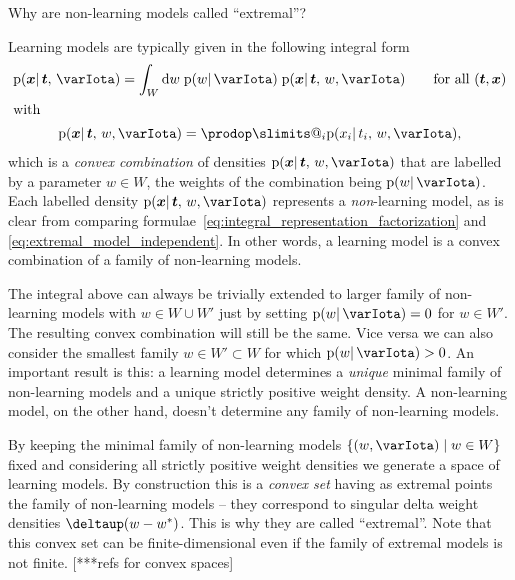 \documentclass[\ifafour a4paper,12pt,\else a5paper,10pt,\fi%
onecolumn,oneside,article,%
british%
]{memoir}
\makeatletter
\theoremstyle{remark}
\theoremstyle{innote}
\def\prod{\DOTSI\prodop\slimits@}
\newcommand*{\delt}{\deltaup}%
\newcommand*{\di}{\mathrm{d}}%
\newcommand*{\suchthat}{\mid}%
\DeclarePairedDelimiter\set{\{}{\}}
\newcommand*{\pf}{\mathrm{p}}%
\renewcommand*{\|}{\mathpunct{|}}
\newcommand*{\yI}{\varIota}
\newcommand*{\yt}{\bm{t}}
\newcommand*{\yx}{\bm{x}}
\newcommand*{\yw}{w}
\newcommand*{\yws}{W}
\newcommand*{\ywp}{\yw^{*}}
\makeatother
\begin{document}
\bigskip

Why are non-learning models called \enquote{extremal}?

Learning models are typically given in the following integral form
\begin{subequations}
    \label{eq:integral_representation_learning_model}
  \begin{gather}
    \pf(\yx \| \yt,\, \yI) =
    \int_{\yws} \di\yw\; \pf(\yw \| \yI)\;
    \pf(\yx \| \yt,\, \yw, \yI)
    \qquad\text{for all $(\yt,\yx)$}
    \\
    \shortintertext{with}
    \label{eq:integral_representation_factorization}
    \pf(\yx \| \yt,\, \yw, \yI) =
    \prod_i  \pf(x_i \| t_i,\, \yw, \yI),
  \end{gather}
\end{subequations}
which is a \emph{convex combination} of densities
$\pf(\yx \| \yt,\, \yw, \yI)$ that are labelled by a parameter
$\yw \in \yws$, the weights of the combination being $\pf(\yw \| \yI)$.
Each labelled density $\pf(\yx \| \yt,\, \yw, \yI)$ represents a
\emph{non}-learning model, as is clear from comparing
formulae~\eqref{eq:integral_representation_factorization} and
\eqref{eq:extremal_model_independent}. In other words, a learning model is
a convex combination of a family of non-learning models.

The integral above can always be trivially extended to larger family of
non-learning models with $\yw \in \yws \cup \yws'$ just by setting
$\pf(\yw \| \yI) = 0$ for $\yw \in \yws'$. The resulting convex combination
will still be the same. Vice versa we can also consider the smallest family
$\yw \in \yws' \subset \yws$ for which $\pf(\yw \| \yI)>0$. An important
result is this: a learning model determines a \emph{unique} minimal family
of non-learning models and a unique strictly positive weight density. A
non-learning model, on the other hand, doesn't determine any family of
non-learning models.

By keeping the minimal family of non-learning models
$\set{(\yw, \yI) \suchthat \yw \in \yws}$ fixed and considering all
strictly positive weight densities we generate a space of learning models.
By construction this is a \emph{convex set} having as extremal points the
family of non-learning models -- they correspond to singular delta weight
densities $\delt(\yw-\ywp)$. This is why they are called \enquote{extremal}.
Note that this convex set can be finite-dimensional even if the family of
extremal models is not finite. [***refs for convex spaces]
\end{document}
